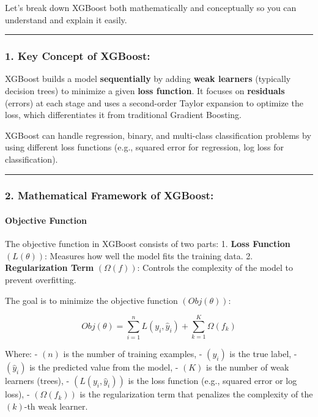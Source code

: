 \documentclass[12pt]{book}
\begin{document}
Let's break down XGBoost both mathematically and conceptually so you can
understand and explain it easily.

\begin{center}\rule{0.5\linewidth}{0.5pt}\end{center}

\subsubsection{\texorpdfstring{1. \textbf{Key Concept of
XGBoost:}}{1. Key Concept of XGBoost:}}\label{key-concept-of-xgboost}

XGBoost builds a model \textbf{sequentially} by adding \textbf{weak
learners} (typically decision trees) to minimize a given \textbf{loss
function}. It focuses on \textbf{residuals} (errors) at each stage and
uses a second-order Taylor expansion to optimize the loss, which
differentiates it from traditional Gradient Boosting.

XGBoost can handle regression, binary, and multi-class classification
problems by using different loss functions (e.g., squared error for
regression, log loss for classification).

\begin{center}\rule{0.5\linewidth}{0.5pt}\end{center}

\subsubsection{\texorpdfstring{2. \textbf{Mathematical Framework of
XGBoost:}}{2. Mathematical Framework of XGBoost:}}\label{mathematical-framework-of-xgboost}

\paragraph{Objective Function}\label{objective-function}

The objective function in XGBoost consists of two parts: 1. \textbf{Loss
Function} \(( L(\theta) )\): Measures how well the model fits the
training data. 2. \textbf{Regularization Term} \(( \Omega(f) )\):
Controls the complexity of the model to prevent overfitting.

The goal is to minimize the objective function \(( Obj(\theta) )\):

\[
Obj(\theta) = \sum_{i=1}^{n} L(y_i, \hat{y}_i) + \sum_{k=1}^{K} \Omega(f_k)
\]

Where: - \(( n )\) is the number of training examples, - \(( y_i )\) is
the true label, - \(( \hat{y}_i )\) is the predicted value from the
model, - \(( K )\) is the number of weak learners (trees), -
\(( L(y_i, \hat{y}_i) )\) is the loss function (e.g., squared error or
log loss), - \(( \Omega(f_k) )\) is the regularization term that
penalizes the complexity of the \(( k )\)-th weak learner.
\end{document}
